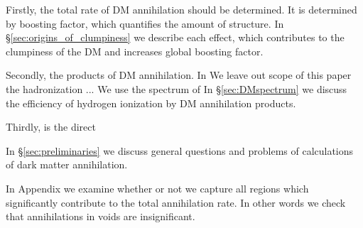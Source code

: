 Firstly, the total rate of DM annihilation should be determined. It is determined by boosting factor, which quantifies the amount of structure. In \S\ref{sec:origins_of_clumpiness} we describe each effect, which contributes to the clumpiness of the DM and increases global boosting factor.

Secondly, the products of DM annihilation. In 
We leave out scope of this paper the hadronization ... We use the spectrum of 
In \S\ref{sec:DMspectrum} we discuss the efficiency of hydrogen ionization by DM annihilation products.

Thirdly, is the direct

In \S\ref{sec:preliminaries} we discuss general questions and problems of calculations of dark matter annihilation.


In Appendix we examine whether or not we capture all regions which significantly contribute to the total annihilation rate. In other words we check that annihilations in voids are insignificant.
